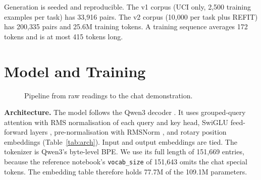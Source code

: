 \documentclass[conference]{IEEEtran}
\begin{document}
Generation is seeded and reproducible. The v1 corpus (UCI only, 2{,}500 training examples per task) has 33{,}916
pairs. The v2 corpus (10{,}000 per task plus REFIT) has 200{,}335 pairs and 25.6M training tokens. A training
sequence averages 172 tokens and is at most 415 tokens long.

\section{Model and Training}

\begin{figure}[t]
\centering
{}
\caption{Pipeline from raw readings to the chat demonstration.}
\label{fig:pipeline}
\end{figure}

\textbf{Architecture.} The model follows the Qwen3 decoder \cite{qwen3}. It uses grouped-query attention
\cite{ainslie2023gqa} with RMS normalisation of each query and key head, SwiGLU feed-forward layers
\cite{shazeer2020glu}, pre-normalisation with RMSNorm \cite{zhang2019rmsnorm}, and rotary position embeddings
\cite{su2024roformer} (Table~\ref{tab:arch}). Input and output embeddings are tied. The tokenizer is Qwen3's
byte-level BPE. We use its full length of 151{,}669 entries, because the reference notebook's \texttt{vocab\_size}
of 151{,}643 omits the chat special tokens. The embedding table therefore holds 77.7M of the 109.1M parameters.
\end{document}
